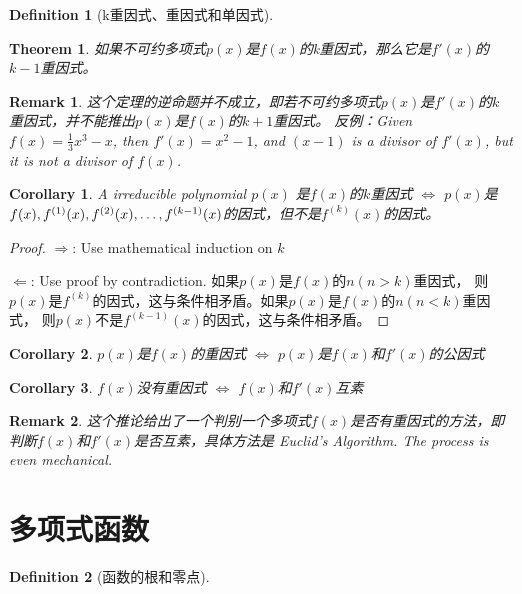 \documentclass[onecolumn]{ctexart}
\newtheorem{definition}{Definition}
\newtheorem{theorem}{Theorem}
\newtheorem{corollary}{Corollary}
\newtheorem{remark}{Remark}
\begin{document}
\begin{definition}[k重因式、重因式和单因式]
  
\end{definition}

\begin{theorem}
  如果不可约多项式$p(x)$是$f(x)$的k重因式，那么它是$f'(x)$的$k-1$重因式。
\end{theorem}
\begin{remark}
  这个定理的逆命题并不成立，即若不可约多项式$p(x)$是$f'(x)$的$k$重因式，并不能推出$p(x)$是$f(x)$的$k+1$重因式。
  反例：Given $f(x) = \frac{1}{3}x^3 - x$, then $f'(x) = x^2 - 1$, and $(x - 1)$ is a divisor of 
  $f'(x)$, but it is not a divisor of $f(x)$.
\end{remark}

\begin{corollary}
  A irreducible polynomial $p(x)$ 是$f(x)$的$k$重因式 $\Leftrightarrow$ $p(x)$是$f(x), f^{(1)}(x), f^{(2)}(x), \ldots, \\ 
  f^{(k-1)}(x)$的因式，但不是$f^{(k)}(x)$的因式。
\end{corollary}
\begin{proof}
  $\Rightarrow$: Use mathematical induction on $k$

  $\Leftarrow$: Use proof by contradiction. 如果$p(x)$是$f(x)$的$n (n > k)$重因式，
  则$p(x)$是$f^{(k)}$的因式，这与条件相矛盾。如果$p(x)$是$f(x)$的$n (n < k)$重因式，
  则$p(x)$不是$f^{(k-1)}(x)$的因式，这与条件相矛盾。
\end{proof}

\begin{corollary}
  $p(x)$是$f(x)$的重因式 $\Leftrightarrow$ $p(x)$是$f(x)$和$f'(x)$的公因式
\end{corollary}

\begin{corollary}
  $f(x)$没有重因式 $\Leftrightarrow$ $f(x)$和$f'(x)$互素
\end{corollary}
\begin{remark}
  这个推论给出了一个判别一个多项式$f(x)$是否有重因式的方法，即判断$f(x)$和$f'(x)$是否互素，具体方法是
  Euclid's Algorithm. The process is even mechanical.
\end{remark}

\section{多项式函数}

\begin{definition}[函数的根和零点]
  
\end{definition}
\end{document}
